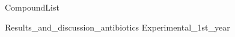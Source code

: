 \documentclass[10pt,a4paper]{article}
\begin{document}
	

{CompoundList}





{Results_and_discussion_antibiotics}
{Experimental_1st_year}

\newpage
{}


\listoftodos
\end{document}
